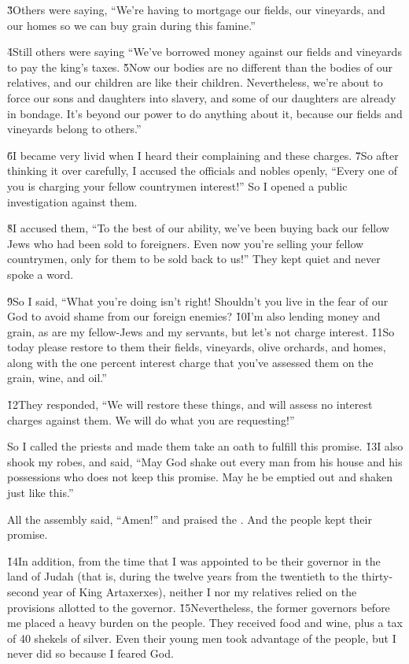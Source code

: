 \v{3}Others were saying, ``We're having to mortgage our fields, our vineyards, and our homes so we can buy grain during this famine.''

\v{4}Still others were saying ``We've borrowed money against our fields and vineyards to pay the king's taxes. \v{5}Now our bodies are no different than the bodies of our relatives, and our children are like their children. Nevertheless, we're about to force our sons and daughters into slavery, and some of our daughters are already in bondage. It's beyond our power to do anything about it, because our fields and vineyards belong to others.''

\v{6}I became very livid when I heard their complaining and these charges. \v{7}So after thinking it over carefully, I accused the officials and nobles openly, ``Every one of you is charging your fellow countrymen interest!'' So I opened a public investigation against them.

\v{8}I accused them, ``To the best of our ability, we've been buying back our fellow Jews who had been sold to foreigners. Even now you're selling your fellow countrymen, only for them to be sold back to us!'' They kept quiet and never spoke a word.

\v{9}So I said, ``What you're doing isn't right! Shouldn't you live in the fear of our God to avoid shame from our foreign enemies? \v{10}I'm also lending money and grain, as are my fellow-Jews and my servants, but let's not charge interest. \v{11}So today please restore to them their fields, vineyards, olive orchards, and homes, along with the one percent interest charge that you've assessed them on the grain, wine, and oil.''

\v{12}They responded, ``We will restore these things, and will assess no interest charges against them. We will do what you are requesting!''

So I called the priests and made them take an oath to fulfill this promise. \v{13}I also shook my robes, and said, ``May God shake out every man from his house and his possessions who does not keep this promise. May he be emptied out and shaken just like this.''

All the assembly said, ``Amen!'' and praised the . And the people kept their promise.

\v{14}In addition, from the time that I was appointed to be their governor in the land of Judah (that is, during the twelve years from the twentieth to the thirty-second year of King Artaxerxes), neither I nor my relatives relied on the provisions allotted to the governor. \v{15}Nevertheless, the former governors before me placed a heavy burden on the people. They received food and wine, plus a tax of 40 shekels of silver. Even their young men took advantage of the people, but I never did so because I feared God.

